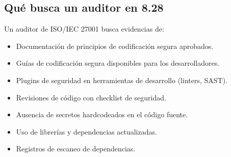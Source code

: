 \begin{table}[h]
\centering
\small
{}
\caption{Principios de prevención para las categorías OWASP Top 10}
\label{tab:owasp-prevencion}
\end{table}

\subsection{Qué busca un auditor en 8.28}

Un auditor de ISO/IEC 27001 busca evidencias de:

\begin{itemize}
    \item Documentación de principios de codificación segura aprobados.
    \item Guías de codificación segura disponibles para los desarrolladores.
    \item Plugins de seguridad en herramientas de desarrollo (linters, SAST).
    \item Revisiones de código con checklist de seguridad.
    \item Ausencia de secretos hardcodeados en el código fuente.
    \item Uso de librerías y dependencias actualizadas.
    \item Registros de escaneo de dependencias.
\end{itemize}
